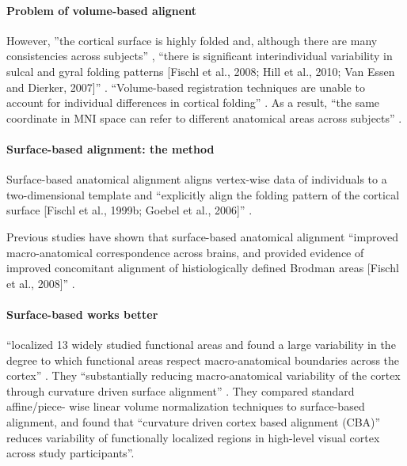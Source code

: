 \paragraph{Problem of volume-based alignent}

However, ''the cortical surface is highly folded and, although there are many
consistencies across subjects'' \citep{frost2012measuring}, ``there is
significant interindividual variability in sulcal and gyral folding patterns
[Fischl et al., 2008; Hill et al., 2010; Van Essen and Dierker, 2007]''
\citep{zhen2017quantifying}.
%
``Volume-based registration techniques are unable to account for individual
differences in cortical folding'' \citep{frost2012measuring}.
%
As a result, ``the same coordinate in MNI space can refer to different
anatomical areas across subjects'' \citep{frost2012measuring}.



\paragraph{Surface-based alignment: the method}

Surface-based anatomical alignment \citep{fischl1999cortical} aligns vertex-wise
data of individuals to a two-dimensional template \citep[e.g., FreeSurfer
fsaverage template;][]{fischl1999high} and ``explicitly align the folding
pattern of the cortical surface [Fischl et al., 1999b; Goebel et al., 2006]''
\citep{frost2012measuring}.

Previous studies have shown that surface-based anatomical alignment ``improved
macro-anatomical correspondence across brains, and provided evidence of
improved concomitant alignment of histiologically defined Brodman areas [Fischl
et al., 2008]'' \citep{frost2012measuring}.


\paragraph{Surface-based works better}


\citet{frost2012measuring} ``localized 13 widely studied functional areas and
found a large variability in the degree to which functional areas respect
macro-anatomical boundaries across the cortex'' \citep{frost2012measuring}.
%
They ``substantially reducing macro-anatomical variability of the cortex through
curvature driven surface alignment'' \citep{frost2012measuring}.
They compared standard affine/piece- wise linear volume normalization techniques
to surface-based alignment,
%
and found that ``curvature driven cortex based alignment
(CBA)'' reduces variability of functionally localized regions in high-level
visual cortex across study participants''.


